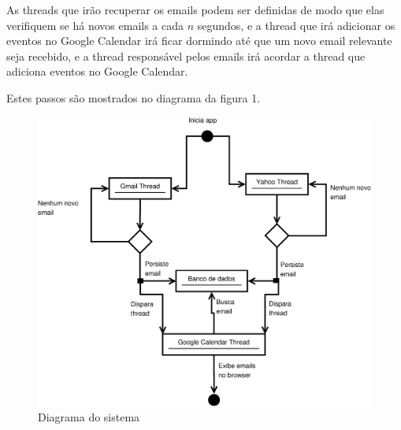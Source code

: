 \documentclass[10pt]{article}
\begin{document}
As threads que irão recuperar os emails podem ser definidas de modo que elas verifiquem se há novos emails a cada $n$ segundos, e a thread que irá adicionar os eventos no Google Calendar irá ficar dormindo até que um novo email relevante seja recebido, e a thread responsável pelos emails irá acordar a thread que adiciona eventos no Google Calendar.

Estes passos são mostrados no diagrama da figura 1.

\begin{figure}
\label{fig:diagrama}
 \includegraphics[scale=0.6]{diagrama}
 \caption{Diagrama do sistema}
\end{figure}
\end{document}
